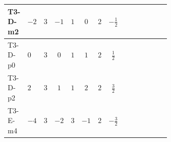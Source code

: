 \documentclass[8pt]{article}
\begin{document}
\begin{landscape}
\begin{longtable}{@{}llcccccc >{\raggedright\arraybackslash}p{0.21\linewidth} >{\raggedright\arraybackslash}p{0.21\linewidth} >{\raggedright\arraybackslash}p{0.21\linewidth}@{}}
\midrule
T3-D-m2 & $-2$ & $3$ & $-1$ & $1$ & $0$ & $2$ & $-\frac{1}{2}$ & \scriptsize\adjustbox{max width=\linewidth}{$\begin{gathered} +3 {\lambda_{HS_1}^{(A)}}^2\end{gathered}$} & \scriptsize\adjustbox{max width=\linewidth}{$\begin{gathered} +\frac{7 {\lambda_{S_1}^{(1)}}^2}{4}\end{gathered}$} & \scriptsize\adjustbox{max width=\linewidth}{$\begin{gathered} +22 {\lambda_{S_1}^{(A)}}^2\end{gathered}$} \\
\midrule
T3-D-p0 & $0$ & $3$ & $0$ & $1$ & $1$ & $2$ & $\frac{1}{2}$ & \scriptsize\adjustbox{max width=\linewidth}{$\begin{gathered} +3 {\lambda_{HS_1}^{(A)}}^2\end{gathered}$} & \scriptsize\adjustbox{max width=\linewidth}{$\begin{gathered} +\frac{7 {\lambda_{S_1}^{(1)}}^2}{4}\end{gathered}$} & \scriptsize\adjustbox{max width=\linewidth}{$\begin{gathered} +22 {\lambda_{S_1}^{(A)}}^2\end{gathered}$} \\
\midrule
T3-D-p2 & $2$ & $3$ & $1$ & $1$ & $2$ & $2$ & $\frac{3}{2}$ & \scriptsize\adjustbox{max width=\linewidth}{$\begin{gathered} +3 {\lambda_{HS_1}^{(A)}}^2\end{gathered}$} & \scriptsize\adjustbox{max width=\linewidth}{$\begin{gathered} +\frac{7 {\lambda_{S_1}^{(1)}}^2}{4}\end{gathered}$} & \scriptsize\adjustbox{max width=\linewidth}{$\begin{gathered} +22 {\lambda_{S_1}^{(A)}}^2\end{gathered}$} \\
\midrule
T3-E-m4 & $-4$ & $3$ & $-2$ & $3$ & $-1$ & $2$ & $-\frac{3}{2}$ & \scriptsize\adjustbox{max width=\linewidth}{$\begin{gathered} +3 {\lambda_{HS_1}^{(A)}}^2\end{gathered}$} & \scriptsize\adjustbox{max width=\linewidth}{$\begin{gathered} +\frac{7 {\lambda_{S_1}^{(1)}}^2}{4}\end{gathered}$} & \scriptsize\adjustbox{max width=\linewidth}{$\begin{gathered} +22 {\lambda_{S_1}^{(A)}}^2\end{gathered}$} \\

\end{longtable}
\end{landscape}
\end{document}
